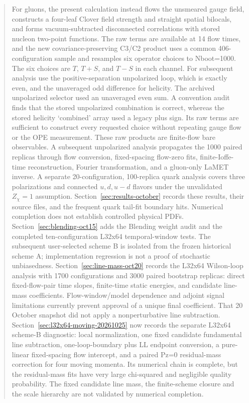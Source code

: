 \documentclass[11pt]{article}
\numberwithin{equation}{section}
\begin{document}
\begin{abstract}
For gluons, the present calculation instead flows the unsmeared gauge field,
constructs a four-leaf Clover field strength and straight spatial bilocals,
and forms vacuum-subtracted disconnected correlations with stored nucleon
two-point functions.  The raw terms are available at 14 flow times, and the
new covariance-preserving C3/C2 product uses a common 406-configuration sample
and resamples six operator choices to Nboot=1000.  The six choices are \(T\),
\(T+S\), and \(T-S\) in each channel.  For subsequent analysis use the
positive-separation unpolarized loop, which is exactly even, and the
unaveraged odd difference for helicity.  The archived unpolarized selector
used an unaveraged even sum.  A convention audit finds that the stored
unpolarized combination is correct, whereas the stored helicity `combined'
array used a legacy plus sign.  Its raw terms are sufficient to construct
every requested choice without repeating gauge flow or the OPE measurement.
These raw products are finite-flow bare observables. A subsequent
unpolarized analysis propagates the 1000 paired replicas through flow
conversion, fixed-spacing flow-zero fits, finite-Ioffe-time reconstruction,
Fourier transformation, and a gluon-only LaMET inverse. A separate
20-configuration, 100-replica quark analysis covers three polarizations and
connected \(u,d,u-d\) flavors under the unvalidated \(Z_\chi=1\) assumption.
Section~\ref{sec:results-october} records these results, their source files,
and the frequent quark tail-fit boundary hits. Numerical completion does
not establish controlled physical PDFs.
Section~\ref{sec:blending-oct15} adds the Blending weight audit and the
completed ten-configuration L32x64 temporal-window tests. The subsequent
user-selected scheme B is isolated from the frozen historical scheme A;
implementation regression is not a proof of stochastic unbiasedness.
Section~\ref{sec:line-mass-oct20} records the L32x64 Wilson-loop analysis
with 1700 configurations and 3000 paired bootstrap replicas: direct
fixed-flow-pair time slopes, finite-time static energies, and candidate
line-mass coefficients. Flow-window/model dependence and adjoint signal
limitations currently prevent approval of a unique final coefficient.
That 20 October snapshot did not apply a nonperturbative line subtraction.
Section~\ref{sec:l32x64-moving-20261025} now records the separate L32x64
scheme-B diagnostic: local normalization, one fixed candidate fundamental
line subtraction, one-loop-boundary plus LL endpoint conversion, a
pure-linear fixed-spacing flow intercept, and a paired Pz=0 residual-mass
correction for four moving momenta.  Its numerical chain is complete, but
the residual-mass fits have very large chi-squared and negligible quality
probability.  The fixed candidate line mass, the finite-scheme closure and
the scale hierarchy are not validated by numerical completion.
\end{abstract}
\end{document}

